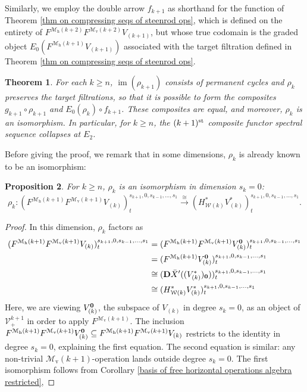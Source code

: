 \documentclass[11pt]{amsart} \renewcommand{\baselinestretch}{1.2}
\theoremstyle{plain}
\newtheorem{thm}{Theorem}[section]
\newtheorem{prop}[thm]{Proposition}
\theoremstyle{definition}
\DeclareMathOperator{\im}{im}
\renewcommand{\to}{\longrightarrow}
\newcommand{\calV}{\mathcal{V}}
\newcommand{\calw}{\mathcal{W}}
\newcommand{\calMv}{\mathcal{M}\dver}
\newcommand{\calMh}{\mathcal{M}\dhor}
\newcommand{\vect}[2]{\calV^{#1}_{#2}}
\newcommand{\UEAX}{\bar{X}'}%
\newcommand{\dver}{_\mathrm{v}}
\newcommand{\dhor}{_\mathrm{h}}
\newcommand{\dual}{\mathbf{D}}
\begin{document}
\begin{Calculations of HWn}
Similarly, we employ the double arrow $f_{k+1}$ as shorthand for the function of Theorem \ref{thm on compressing seqs of steenrod ops}, which is defined on the entirety of $F^{\calMh(k+2)}F^{\calMv(k+2)}V_{(k+1)}$, but whose true codomain is the graded object $E_0(F^{\calMh(k+1)}V_{(k+1)})$ associated with the target filtration defined in Theorem \ref{thm on compressing seqs of steenrod ops}.
\begin{thm}
\label{thm on collapsing of most sseqs}
For each $k\geq n$, $\im(\rho_{k+1})$ consists of permanent cycles and $\rho_k$ preserves the target filtrations, so that it is possible to form the composites $g_{k+1}\circ \rho_{k+1}$ and $E_0(\rho_{k})\circ f_{k+1}$. These composites are equal, and moreover, $\rho_k$ is an isomorphism. In particular, for $k\geq n$, the  $(k+1)^{\textup{st}}$ composite functor spectral sequence collapses at $E_2$.
\end{thm}
Before giving the proof, we remark that in some dimensions, $\rho_k$ is already known to be an isomorphism:
\begin{prop}
\label{isomorphism rho k in some dims}
For $k\geq n$, $\rho_k$ is an isomorphism in dimension $s_k=0$:
\[\rho_k:(F^{\calMh(k+1)}F^{\calMv(k+1)}V_{(k)})^{s_{k+1},0,s_{k-1},\ldots,s_1}_{t} \overset{\cong}{\to}(H^*_{\calw(k)}V^*_{(k)})^{s_{k+1},0,s_{k-1},\ldots,s_1}_{t}.\]
\end{prop}
\begin{proof}
In this dimension, $\rho_k$ factors as
\begin{alignat*}{2}
(F^{\calMh(k+1)}F^{\calMv(k+1)}V_{(k)})^{s_{k+1},0,s_{k-1},\ldots,s_1}_{t}
&=
(F^{\calMh(k+1)} F^{\calMv(k+1)}V_{(k)}^{\textbf{\textup{0}}})^{s_{k+1},0,s_{k-1},\ldots,s_1}_{t}\\
&=(F^{\calMh(k+1)}V_{(k)}^{\textbf{\textup{0}}})^{s_{k+1},0,s_{k-1},\ldots,s_1}_{t}\\
&\cong (\dual\UEAX((V^*_{(k)})_{\textbf{\textup{0}}}))^{s_{k+1},0,s_{k-1},\ldots,s_1}_{t}\\
&\cong (H^*_{\calw(k)}V^*_{(k)})^{s_{k+1},0,s_{k-1},\ldots,s_1}_{t}
\end{alignat*}
Here, we are viewing $V_{(k)}^{\textbf{\textup{0}}}$, the subspace of $V_{(k)}$ in degree $s_k=0$, as an object of $\vect{k+1}{+}$ in order to apply $F^{\calMv(k+1)}$. The inclusion $F^{\calMh(k+1)}F^{\calMv(k+1)}V_{(k)}^{\textbf{\textup{0}}}\subseteq F^{\calMh(k+1)}F^{\calMv(k+1)}V_{(k)}$ restricts to the identity in degree $s_k=0$, explaining the first equation. The second equation is similar: any non-trivial $\calMv(k+1)$-operation lands outside degree $s_k=0$. The first isomorphism follows from Corollary \ref{basis of free horizontal operations algebra restricted}, %

\end{proof}
\end{Calculations of HWn}
\end{document}
